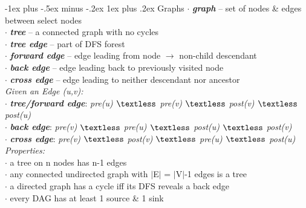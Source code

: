 \documentclass[10pt,landscape]{article}
\makeatletter
\renewcommand{\subsubsection}{\@startsection{subsubsection}{3}{0mm}%
                                {-1ex plus -.5ex minus -.2ex}%
                                {1ex plus .2ex}%
                                {\normalfont\small\bfseries}}
\makeatother
\begin{document}
\begin{multicols}{3}
\subsubsection{Graphs}
{\scriptsize\hspace{5pt} $\cdot$ \textit{\textbf{graph}} -- set of nodes \& edges between select nodes\\
\hspace{5pt} $\cdot$ \textit{\textbf{tree}} -- a connected graph with no cycles\\
\hspace{5pt} $\cdot$ \textit{\textbf{tree edge}} -- part of DFS forest\\
\hspace{5pt} $\cdot$ \textit{\textbf{forward edge}} -- edge leading from node $\rightarrow$ non-child descendant\\
\hspace{5pt} $\cdot$ \textit{\textbf{back edge}} -- edge leading back to previously visited node\\
\hspace{5pt} $\cdot$ \textit{\textbf{cross edge}} -- edge leading to neither descendant nor ancestor\\
{\it Given an Edge (u,v):}\\
\hspace{5pt} $\cdot$ \textit{\textbf{tree/forward edge}}: {\it pre(u) $\textless$ pre(v) $\textless$ post(v) $\textless$ post(u)} \\
\hspace{5pt} $\cdot$ \textit{\textbf{back edge}}: {\it pre(v) $\textless$ pre(u) $\textless$ post(u) $\textless$ post(v)} \\
\hspace{5pt} $\cdot$ \textit{\textbf{cross edge}}: {\it pre(v) $\textless$ post(v) $\textless$ pre(u) $\textless$ post(u)}\\
{\it Properties:}\\
\hspace{5pt} $\cdot$ a tree on n nodes has n-1 edges\\
\hspace{5pt} $\cdot$ any connected undirected graph with $\mid$E$\mid$ = $\mid$V$\mid$-1 edges is a tree\\
\hspace{5pt} $\cdot$ a directed graph has a cycle iff its DFS reveals a back edge\\
\hspace{5pt} $\cdot$ every DAG has at least 1 source \& 1 sink\\
}
\end{multicols}
\end{document}
